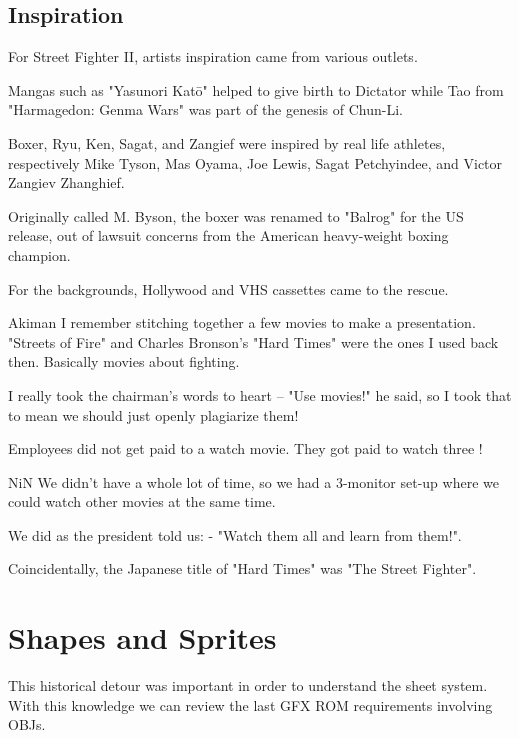 \subsection{Inspiration}
For Street Fighter II, artists inspiration came from various outlets. 

Mangas such as "Yasunori Katō" helped to give birth to Dictator while Tao from "Harmagedon: Genma Wars" was part of the genesis of Chun-Li. 

Boxer, Ryu, Ken, Sagat, and Zangief were inspired by real life athletes, respectively Mike Tyson, Mas Oyama, Joe Lewis, Sagat Petchyindee, and Victor Zangiev Zhanghief.

\begin{trivia}
Originally called M. Byson, the boxer was renamed to "Balrog" for the US release, out of lawsuit concerns from the American heavy-weight boxing champion. 
\end{trivia}

For the backgrounds, Hollywood and VHS cassettes came to the rescue.

\begin{q}{Akiman\cite{ffdevinterview}}
I remember stitching together a few movies to make a presentation. "Streets of Fire" and Charles Bronson’s "Hard Times" were the ones I used back then. Basically movies about fighting. 

I really took the chairman’s words to heart – "Use movies!" he said, so I took that to mean we should just openly plagiarize them!
\end{q}

Employees did not get paid to a watch movie. They got paid to watch three !

\begin{q}{NiN\cite{ffdevinterview}}
We didn't have a whole lot of time, so we had a 3-monitor set-up where we could watch other movies at the same time.

We did as the president told us: - "Watch them all and learn from them!".
\end{q}

\begin{trivia}
Coincidentally, the Japanese title of "Hard Times" was "The Street Fighter".
\end{trivia}


\section{Shapes and Sprites}
This historical detour was important in order to understand the sheet system. With this knowledge we can review the last GFX ROM requirements involving OBJs.  


